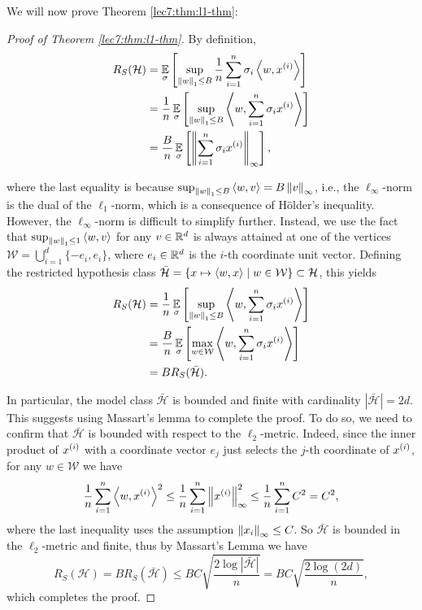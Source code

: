 We will now prove Theorem \ref{lec7:thm:l1-thm}:

\begin{proof}[Proof of Theorem \ref{lec7:thm:l1-thm}]
    By definition,
    \begin{align}
        R_S(\mathcal{H}) &= \Exp_\sigma\sbr{ \sup_{\Norm{w}_1 \le B} \frac{1}{n} \sum_{i=1}^n\sigma_i \inprod{w,x\sp{i}} } \\
        &= \frac{1}{n} \Exp_\sigma\sbr{ \sup_{\Norm{w}_1\le B} \inprod{w,\sum_{i=1}^n\sigma_i x\sp{i}} } \\
        &= \frac{B}{n} \Exp_\sigma\sbr{ \Norm{\sum_{i=1}^n \sigma_i  x\sp{i}}_\infty  },
    \end{align}
    
    where the last equality is because $\sup_{\Norm{w}_1 \leq B}\inprod{w,v} = B\Norm{v}_\infty$, i.e., the $\ell_\infty$-norm is the dual of the $\ell_1$-norm, which is a consequence of H\"older's inequality. However, the $\ell_\infty$-norm is difficult to simplify further. Instead, we use the fact that $\sup_{\Norm{w}_1 \leq 1} \inprod{w,v}$ for any $v \in \R^d$ is always attained at one of the vertices $\mathcal{W} = \bigcup_{i=1}^d \{-e_i,e_i\}$, where $e_i \in \R^d$ is the $i$-th coordinate unit vector. Defining the restricted hypothesis class $\bar{\mathcal{H}} = \{x \mapsto \inprod{w,x} \mid w \in \mathcal{W}\} \subset \mathcal{H}$, this yields
    \begin{align}
        R_S(\mathcal{H}) &= \frac{1}{n} \Exp_\sigma\sbr{ \sup_{\Norm{w}_1 \le B} \inprod{w,\sum_{i=1}^n\sigma_i x\sp{i}} } \\
        &= \frac{B}{n} \Exp_\sigma\sbr{ \max_{w\in\mathcal{W}} \inprod{w,\sum_{i=1}^n\sigma_i x\sp{i}} } \\
        &= BR_S(\bar{\mathcal{H}}).
    \end{align}
    
    In particular, the model class $\bar{\mathcal{H}}$ is bounded and finite with cardinality $|\bar{\mathcal{H}}| = 2d$. This suggests using Massart's lemma to complete the proof. To do so, we need to confirm that $\mathcal{\bar{H}}$ is bounded with respect to the $\ell_2$-metric. Indeed, since the inner product of $x\sp{i}$ with a coordinate vector $e_j$ just selects the $j$-th coordinate of $x\sp{i}$, for any $w \in \mathcal{W}$ we have
    \begin{equation}
        \frac{1}{n}\sum_{i=1}^n \inprod{w,x\sp{i}}^2 \leq \frac{1}{n}\sum_{i=1}^n \Norm{x\sp{i}}^2_\infty \leq \frac{1}{n}\sum_{i=1}^n C^2 = C^2,
    \end{equation}
    where the last inequality uses the assumption $\Norm{x_i}_\infty \leq C$. So $\bar{\mathcal{H}}$ is bounded in the $\ell_2$-metric and finite, thus by Massart's Lemma we have
    \begin{equation}
        R_S(\mathcal{H}) = B R_S(\bar{\mathcal{H}}) \leq BC\sqrt{\frac{2\log|\bar{\mathcal{H}}|}{n}} = BC\sqrt{\frac{2\log(2d)}{n}},
    \end{equation}
    which completes the proof.
\end{proof}

